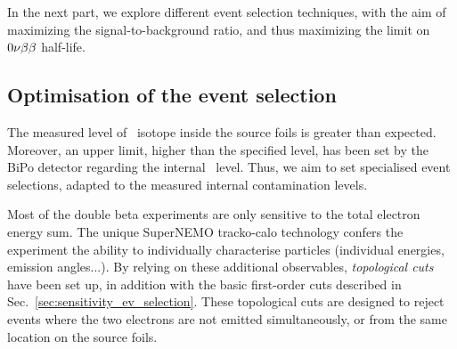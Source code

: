In the next part, we explore different event selection techniques, with the aim of maximizing the signal-to-background ratio, and thus maximizing the limit on $0\nu\beta\beta$ half-life.

\subsection{Optimisation of the event selection}
\label{subsec:opti_ev_selection}

The measured level of \Tl\ isotope inside the source foils is greater than expected.
Moreover, an upper limit, higher than the specified level, has been set by the BiPo detector regarding the internal \Bi\ level.
Thus, we aim to set specialised event selections, adapted to the measured internal contamination levels.

Most of the double beta experiments are only sensitive to the total electron energy sum.
The unique SuperNEMO tracko-calo technology confers the experiment the ability to individually characterise particles (individual energies, emission angles...).
By relying on these additional observables, \emph{topological cuts} have been set up, in addition with the basic first-order cuts described in Sec.~\ref{sec:sensitivity_ev_selection}.
These topological cuts are designed to reject events where the two electrons are not emitted simultaneously, or from the same location on the source foils.

